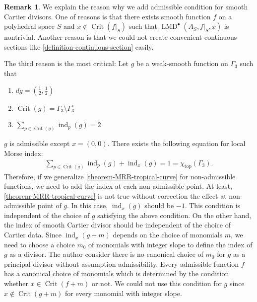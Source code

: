 \documentclass[a4paper,dvipdfmx,reqno,12pt]{amsart}
\theoremstyle{definition}
\newtheorem{remark}[theorem]{Remark}
\newcommand{\opn}[1]{\operatorname{#1}}
\numberwithin{equation}{section}
\begin{document}
\begin{remark}
\label{remark-non-admissible-divisor}
We explain the reason why we add admissible condition for 
smooth Cartier divisors. 
One of reasons is that there exists smooth function $f$
on a polyhedral space $S$ and 
$x\notin\opn{Crit}(f|_S)$ such that
$\opn{LMD}^{\bullet}(A_S,f|_{S},x)$ is nontrivial.
Another reason is that we could not create 
convenient continuous sections like 
\cref{definition-continuous-section} easily.

The third reason is the most critical:
Let 
$g$ be a weak-smooth function on 
$\Gamma_3$
such that 
\begin{enumerate}
\item $dg=(\frac{1}{2},\frac{1}{2})$
\item $\opn{Crit}(g)=\Gamma_3\setminus \Gamma_3^{\circ}$
\item $\sum_{p\in \opn{Crit}(g)}\opn{ind}_p(g)=2$
\end{enumerate}
$g$ is admissible except $x=(0,0)$.
There exists the following equation for local Morse index:
\begin{align}
\sum_{p\in \opn{Crit}(g)}\opn{ind}_p(g)+
\opn{ind}_x(g)=1=\chi_{\opn{top}}(\Gamma_3).
\end{align}
Therefore, if we generalize 
\cref{theorem-MRR-tropical-curve} for non-admissible
functions, we need to add the index at each non-admissible 
point. At least, \cref{theorem-MRR-tropical-curve} is not
true without correction the effect at non-admissible point
of $g$.
In this case, $\opn{ind}_x(g)$ should be $-1$.
This condition is independent of the choice
of $g$ satisfying the above condition.
On the other hand, the index of smooth Cartier
divisor should be independent of the choice of
Cartier data.
Since $\opn{ind}_x(g+m)$ depends on the choice
of monomials $m$, we need to choose a choice $m_0$
of monomials with integer slope to 
define the index of $g$ as a divisor.
The author consider there is no canonical choice
of $m_0$ for $g$ as a principal divisor without
assumption admissibility.
Every admissible function $f$ has a canonical choice
of monomials which is determined by the condition 
whether $x\in \opn{Crit}(f+m)$ or not.
We could not use this condition for $g$ since 
$x\notin \opn{Crit}(g+m)$ for every monomial with
integer slope.
\end{remark}

\end{document}
